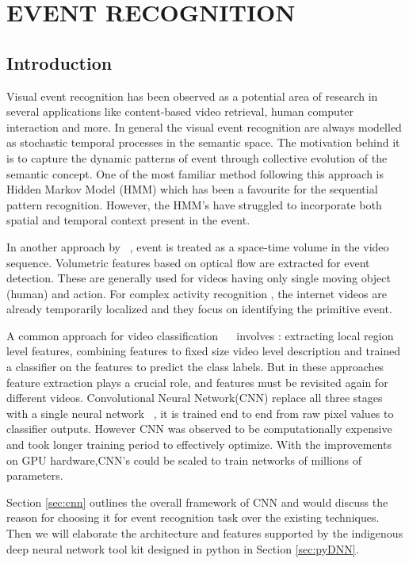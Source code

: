 \chapter{EVENT RECOGNITION}
 \label{chap:eventrec}
 \section{Introduction}
Visual event recognition has been observed as a potential area of research in several applications like  content-based video retrieval, human computer interaction and more. 
In general the visual event recognition are always modelled as stochastic temporal processes in the semantic space. The motivation behind it is to capture the dynamic patterns of event through collective evolution of the semantic concept. One of the most familiar method following this approach is Hidden Markov Model (HMM) which has been a favourite for the sequential pattern recognition. However, the HMM's have struggled to incorporate both spatial and temporal context present in the event.  
\par In another approach by ~\cite{YanKe05}, event is treated as a space-time volume in the video sequence. Volumetric features based on optical flow are extracted for event detection. These are generally used for videos having only single moving object (human) and action. For complex activity recognition \citep{YanKe07}, the internet videos are already temporarily localized and they focus on identifying the primitive event.
\par A common approach for video classification ~\citep{Liu09}~\citep{Niebles10} involves : extracting local region level features, combining features to fixed size video level description and trained a classifier on the features to predict the class labels. But in these approaches feature extraction plays a crucial role, and features must be revisited again for different videos. Convolutional Neural Network(CNN) replace all three stages with a single neural network ~\cite{Ji13}, it is trained end to end from raw pixel values to classifier outputs. However CNN was observed to be computationally expensive and took longer training period to effectively optimize. With the improvements on GPU hardware,CNN's could be scaled to train networks of millions of parameters.

\par Section \ref{sec:cnn} outlines the overall framework of CNN and would discuss the reason for choosing it for event recognition task over the existing techniques. Then we will elaborate the architecture and features supported by the indigenous deep neural network tool kit designed in python in Section \ref{sec:pyDNN}. 

